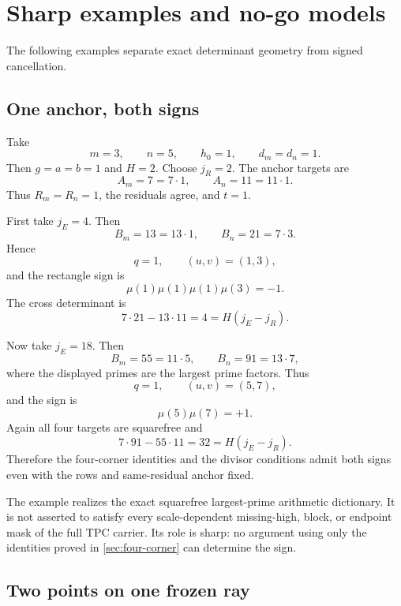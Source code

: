 \section{Sharp examples and no-go models}
\label{sec:counterexamples}

The following examples separate exact determinant geometry from signed
cancellation.

\subsection{One anchor, both signs}

\begin{example}
\label{ex:opposite-sign-rectangles}
Take
\[
 m=3,\qquad n=5,\qquad h_0=1,\qquad d_m=d_n=1.
\]
Then \(g=a=b=1\) and \(H=2\).  Choose \(j_R=2\).  The anchor targets are
\[
 A_m=7=7\cdot1,\qquad
 A_n=11=11\cdot1.
\]
Thus \(R_m=R_n=1\), the residuals agree, and \(t=1\).

First take \(j_E=4\).  Then
\[
 B_m=13=13\cdot1,\qquad
 B_n=21=7\cdot3.
\]
Hence
\[
 q=1,\qquad (u,v)=(1,3),
\]
and the rectangle sign is
\[
 \mu(1)\mu(1)\mu(1)\mu(3)=-1.
\]
The cross determinant is
\[
 7\cdot21-13\cdot11=4=H(j_E-j_R).
\]

Now take \(j_E=18\).  Then
\[
 B_m=55=11\cdot5,\qquad
 B_n=91=13\cdot7,
\]
where the displayed primes are the largest prime factors.  Thus
\[
 q=1,\qquad (u,v)=(5,7),
\]
and the sign is
\[
 \mu(5)\mu(7)=+1.
\]
Again all four targets are squarefree and
\[
 7\cdot91-55\cdot11=32=H(j_E-j_R).
\]
Therefore the four-corner identities and the divisor conditions admit
both signs even with the rows and same-residual anchor fixed.
\end{example}

\begin{remark}
\label{rem:small-example-scope}
The example realizes the exact squarefree largest-prime arithmetic
dictionary.  It is not asserted to satisfy every scale-dependent
missing-high, block, or endpoint mask of the full TPC carrier.  Its role
is sharp: no argument using only the identities proved in
\cref{sec:four-corner} can determine the sign.
\end{remark}

\subsection{Two points on one frozen ray}

